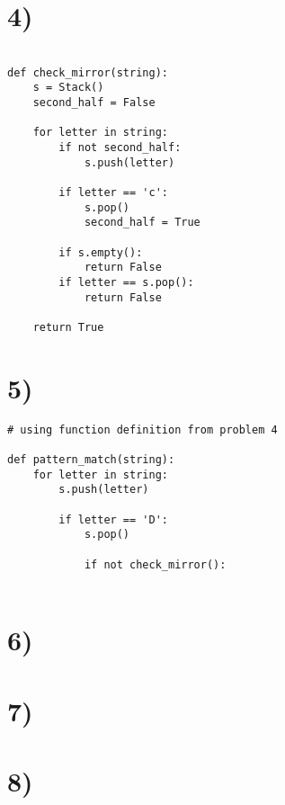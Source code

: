 \documentclass[a4paper,11pt]{article}
\begin{document}

\section*{4)} 
\begin{verbatim}

def check_mirror(string):
    s = Stack()
    second_half = False
    
    for letter in string:
        if not second_half:
            s.push(letter)
        
        if letter == 'c':
            s.pop()
            second_half = True
           
        if s.empty():
            return False 
        if letter == s.pop():
            return False
            
    return True

\end{verbatim}


\section*{5)}
\begin{verbatim}
# using function definition from problem 4

def pattern_match(string):
    for letter in string:
        s.push(letter)
    
        if letter == 'D':
            s.pop()
        
            if not check_mirror():


\end{verbatim}


\section*{6)}



\section*{7)}



\section*{8)}
\end{document}
